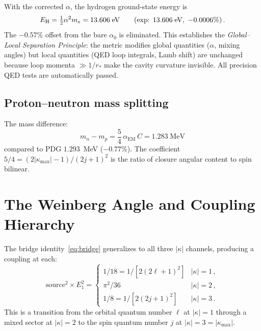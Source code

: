 \documentclass[aps,prd,twocolumn,superscriptaddress,nofootinbib,longbibliography]{revtex4-2}
\newcommand{\rstar}{r_{*}}
\newcommand{\kmax}{|\kappa_{\mathrm{max}}|}
\newcommand{\aEM}{\alpha_{\mathrm{EM}}}
\begin{document}
With the corrected $\alpha$, the hydrogen ground-state energy is
\begin{equation}
  E_{\rm H} = \tfrac{1}{2}\alpha^2 m_e = 13.606\;\text{eV}
  \qquad(\text{exp: }13.606\;\text{eV},\ {-0.0006\%})\,.
\end{equation}
The $-0.57\%$ offset from the bare $\alpha_0$ is eliminated.  This
establishes the \emph{Global--Local Separation Principle}: the metric
modifies global quantities ($\alpha$, mixing angles) but local
quantities (QED loop integrals, Lamb shift) are unchanged because loop
momenta $\gg 1/\rstar$ make the cavity curvature invisible.  All
precision QED tests are automatically passed.

\subsection{Proton--neutron mass splitting}

The mass difference:
\begin{equation}\label{eq:pn}
  m_n - m_p = \frac{5}{4}\,\aEM\,C = 1.283\;\mathrm{MeV}
\end{equation}
compared to PDG $1.293$~MeV ($-0.77\%$).  The coefficient
$5/4 = (2\kmax - 1)/(2j+1)^2$ is the ratio of closure angular
content to spin bilinear.

\section{The Weinberg Angle and Coupling Hierarchy}\label{sec:weinberg}

The bridge identity~\eqref{eq:bridge} generalizes to all three
$|\kappa|$ channels, producing a coupling at each:
\begin{equation}\label{eq:bridge-gen}
  \mathrm{source}^2 \!\times E_1^2 =
  \begin{cases}
    1/18 = 1/[2(2\ell+1)^2] & |\kappa| = 1\,,\\
    \pi^2/36 & |\kappa| = 2\,,\\
    1/8 = 1/[2(2j+1)^2] & |\kappa| = 3\,.
  \end{cases}
\end{equation}
This is a transition from the orbital quantum number $\ell$ at
$|\kappa| = 1$ through a mixed sector at $|\kappa| = 2$ to the spin
quantum number $j$ at $|\kappa| = 3 = \kmax$.
\end{document}
